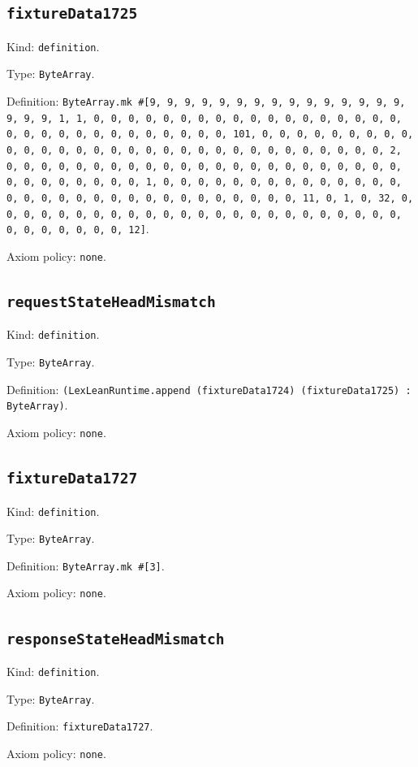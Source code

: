 \documentclass[11pt]{article}
\begin{document}
\subsection*{\texttt{fixtureData1725}}
\noindent Kind: \texttt{definition}.\par
\noindent Type: \texttt{ByteArray}.\par
\noindent Definition: \texttt{ByteArray.mk \#[9, 9, 9, 9, 9, 9, 9, 9, 9, 9, 9, 9, 9, 9, 9, 9, 9, 9, 1, 1, 0, 0, 0, 0, 0, 0, 0, 0, 0, 0, 0, 0, 0, 0, 0, 0, 0, 0, 0, 0, 0, 0, 0, 0, 0, 0, 0, 0, 0, 0, 0, 101, 0, 0, 0, 0, 0, 0, 0, 0, 0, 0, 0, 0, 0, 0, 0, 0, 0, 0, 0, 0, 0, 0, 0, 0, 0, 0, 0, 0, 0, 0, 0, 2, 0, 0, 0, 0, 0, 0, 0, 0, 0, 0, 0, 0, 0, 0, 0, 0, 0, 0, 0, 0, 0, 0, 0, 0, 0, 0, 0, 0, 0, 0, 0, 1, 0, 0, 0, 0, 0, 0, 0, 0, 0, 0, 0, 0, 0, 0, 0, 0, 0, 0, 0, 0, 0, 0, 0, 0, 0, 0, 0, 0, 0, 0, 0, 11, 0, 1, 0, 32, 0, 0, 0, 0, 0, 0, 0, 0, 0, 0, 0, 0, 0, 0, 0, 0, 0, 0, 0, 0, 0, 0, 0, 0, 0, 0, 0, 0, 0, 0, 0, 12]}.\par
\noindent Axiom policy: \texttt{none}.\par
\subsection*{\texttt{requestStateHeadMismatch}}
\noindent Kind: \texttt{definition}.\par
\noindent Type: \texttt{ByteArray}.\par
\noindent Definition: \texttt{(LexLeanRuntime.append (fixtureData1724) (fixtureData1725) : ByteArray)}.\par
\noindent Axiom policy: \texttt{none}.\par
\subsection*{\texttt{fixtureData1727}}
\noindent Kind: \texttt{definition}.\par
\noindent Type: \texttt{ByteArray}.\par
\noindent Definition: \texttt{ByteArray.mk \#[3]}.\par
\noindent Axiom policy: \texttt{none}.\par
\subsection*{\texttt{responseStateHeadMismatch}}
\noindent Kind: \texttt{definition}.\par
\noindent Type: \texttt{ByteArray}.\par
\noindent Definition: \texttt{fixtureData1727}.\par
\noindent Axiom policy: \texttt{none}.\par
\end{document}
